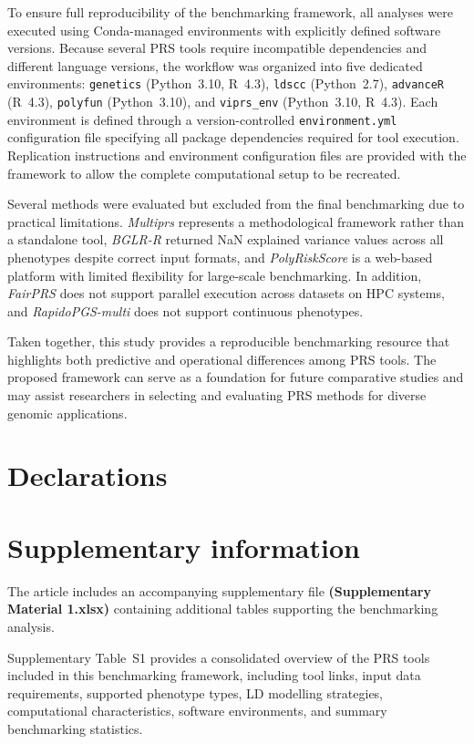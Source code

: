 \documentclass[pdflatex,sn-basic]{sn-jnl}
\begin{document}
To ensure full reproducibility of the benchmarking framework, all analyses were executed using Conda-managed environments with explicitly defined software versions. Because several PRS tools require incompatible dependencies and different language versions, the workflow was organized into five dedicated environments: \texttt{genetics} (Python~3.10, R~4.3), \texttt{ldscc} (Python~2.7), \texttt{advanceR} (R~4.3), \texttt{polyfun} (Python~3.10), and \texttt{viprs\_env} (Python~3.10, R~4.3). Each environment is defined through a version-controlled \texttt{environment.yml} configuration file specifying all package dependencies required for tool execution. Replication instructions and environment configuration files are provided with the framework to allow the complete computational setup to be recreated.

Several methods were evaluated but excluded from the final benchmarking due to practical limitations. \textit{Multiprs} represents a methodological framework rather than a standalone tool, \textit{BGLR-R} returned NaN explained variance values across all phenotypes despite correct input formats, and \textit{PolyRiskScore} is a web-based platform with limited flexibility for large-scale benchmarking. In addition, \textit{FairPRS} does not support parallel execution across datasets on HPC systems, and \textit{RapidoPGS-multi} does not support continuous phenotypes.

Taken together, this study provides a reproducible benchmarking resource that highlights both predictive and operational differences among PRS tools. The proposed framework can serve as a foundation for future comparative studies and may assist researchers in selecting and evaluating PRS methods for diverse genomic applications.




\section*{Declarations}
 \backmatter

\section{Supplementary information}
The article includes an accompanying supplementary file \textbf{(Supplementary Material 1.xlsx)} containing additional tables supporting the benchmarking analysis.

Supplementary Table~S1 provides a consolidated overview of the PRS tools included in this benchmarking framework, including tool links, input data requirements, supported phenotype types, LD modelling strategies, computational characteristics, software environments, and summary benchmarking statistics.
\end{document}
